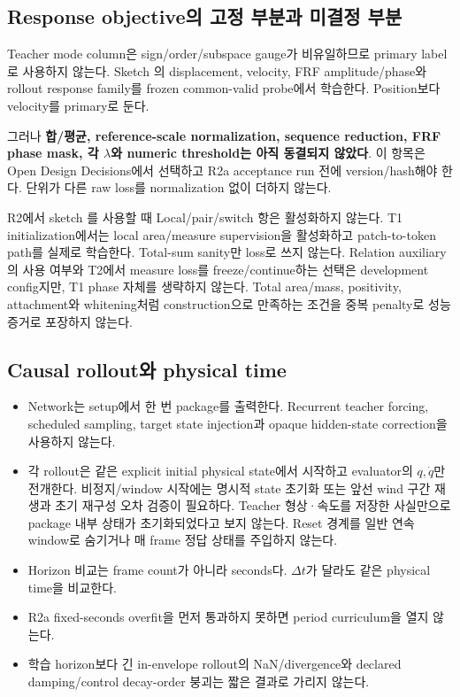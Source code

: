 \documentclass[10pt]{article}
\begin{document}
\subsection{Response objective의 고정 부분과 미결정 부분}

Teacher mode column은 sign/order/subspace gauge가 비유일하므로 primary label로 사용하지 않는다.
Sketch 의 displacement, velocity, FRF amplitude/phase와 rollout response family를
frozen common-valid probe에서 학습한다. Position보다 velocity를 primary로 둔다.

그러나 \textbf{합/평균, reference-scale normalization, sequence reduction, FRF phase mask,
각 \(\lambda\)와 numeric threshold는 아직 동결되지 않았다}. 이 항목은 Open Design Decisions에서 선택하고
R2a acceptance run 전에 version/hash해야 한다. 단위가 다른 raw loss를 normalization 없이 더하지 않는다.

R2에서 sketch 를 사용할 때 Local/pair/switch 항은 활성화하지 않는다.
T1 initialization에서는 local area/measure supervision을 활성화하고 patch-to-token path를 실제로
학습한다. Total-sum sanity만 loss로 쓰지 않는다. Relation auxiliary의 사용 여부와 T2에서 measure loss를
freeze/continue하는 선택은 development config지만, T1 phase 자체를 생략하지 않는다.
Total area/mass, positivity, attachment와 whitening처럼 construction으로 만족하는 조건을 중복 penalty로
성능 증거로 포장하지 않는다.

\subsection{Causal rollout와 physical time}

\begin{itemize}
  \item Network는 setup에서 한 번 package를 출력한다. Recurrent teacher forcing, scheduled sampling,
  target state injection과 opaque hidden-state correction을 사용하지 않는다.
  \item 각 rollout은 같은 explicit initial physical state에서 시작하고 evaluator의 \(q,\dot q\)만 전개한다.
  비정지/window 시작에는 명시적 state 초기화 또는 앞선 wind 구간 재생과 초기 재구성 오차 검증이 필요하다.
  Teacher 형상·속도를 저장한 사실만으로 package 내부 상태가 초기화되었다고 보지 않는다.
  Reset 경계를 일반 연속 window로 숨기거나 매 frame 정답 상태를 주입하지 않는다.
  \item Horizon 비교는 frame count가 아니라 seconds다. \(\Delta t\)가 달라도 같은 physical time을 비교한다.
  \item R2a fixed-seconds overfit을 먼저 통과하지 못하면 period curriculum을 열지 않는다.
  \item 학습 horizon보다 긴 in-envelope rollout의 NaN/divergence와 declared damping/control decay-order 붕괴는
  짧은 결과로 가리지 않는다.
\end{itemize}
\end{document}
